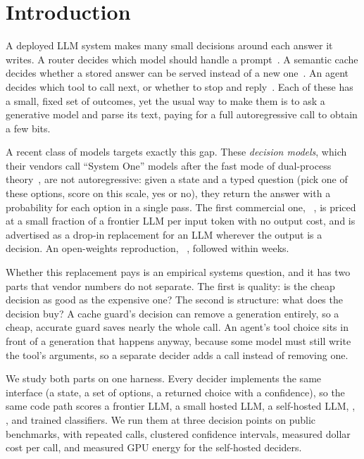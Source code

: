 \section{Introduction}
\label{sec:intro}

A deployed LLM system makes many small decisions around each answer it writes.
A router decides which model should handle a prompt~\cite{chen2023frugalgpt,ong2024routellm}.
A semantic cache decides whether a stored answer can be served instead of a new one~\cite{bang2023gptcache,schroeder2025vcache}.
An agent decides which tool to call next, or whether to stop and reply~\cite{yao2024taubench}.
Each of these has a small, fixed set of outcomes, yet the usual way to make them is to ask a generative model and parse its text, paying for a full autoregressive call to obtain a few bits.

A recent class of models targets exactly this gap.
These \emph{decision models}, which their vendors call ``System One'' models after the fast mode of dual-process theory~\cite{kahneman2011thinking}, are not autoregressive: given a state and a typed question (pick one of these options, score on this scale, yes or no), they return the answer with a probability for each option in a single pass.
The first commercial one, \jev~\cite{typesafe2026jev}, is priced at a small fraction of a frontier LLM per input token with no output cost, and is advertised as a drop-in replacement for an LLM wherever the output is a decision.
An open-weights reproduction, \kev~\cite{palmer2026kev}, followed within weeks.

Whether this replacement pays is an empirical systems question, and it has two parts that vendor numbers do not separate.
The first is quality: is the cheap decision as good as the expensive one?
The second is structure: what does the decision buy?
A cache guard's decision can remove a generation entirely, so a cheap, accurate guard saves nearly the whole call.
An agent's tool choice sits in front of a generation that happens anyway, because some model must still write the tool's arguments, so a separate decider adds a call instead of removing one.

We study both parts on one harness.
Every decider implements the same interface (a state, a set of options, a returned choice with a confidence), so the same code path scores a frontier LLM, a small hosted LLM, a self-hosted LLM, \jev, \kev, and trained classifiers.
We run them at three decision points on public benchmarks, with repeated calls, clustered confidence intervals, measured dollar cost per call, and measured GPU energy for the self-hosted deciders.

